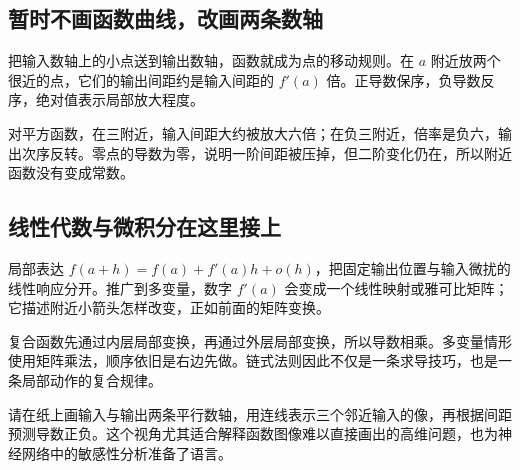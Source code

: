 \subsection*{暂时不画函数曲线，改画两条数轴}
把输入数轴上的小点送到输出数轴，函数就成为点的移动规则。在 $a$ 附近放两个很近的点，它们的输出间距约是输入间距的 $f'(a)$ 倍。正导数保序，负导数反序，绝对值表示局部放大程度。

对平方函数，在三附近，输入间距大约被放大六倍；在负三附近，倍率是负六，输出次序反转。零点的导数为零，说明一阶间距被压掉，但二阶变化仍在，所以附近函数没有变成常数。

\subsection*{线性代数与微积分在这里接上}
局部表达 $f(a+h)=f(a)+f'(a)h+o(h)$，把固定输出位置与输入微扰的线性响应分开。推广到多变量，数字 $f'(a)$ 会变成一个线性映射或雅可比矩阵；它描述附近小箭头怎样改变，正如前面的矩阵变换。

复合函数先通过内层局部变换，再通过外层局部变换，所以导数相乘。多变量情形使用矩阵乘法，顺序依旧是右边先做。链式法则因此不仅是一条求导技巧，也是一条局部动作的复合规律。

请在纸上画输入与输出两条平行数轴，用连线表示三个邻近输入的像，再根据间距预测导数正负。这个视角尤其适合解释函数图像难以直接画出的高维问题，也为神经网络中的敏感性分析准备了语言。
